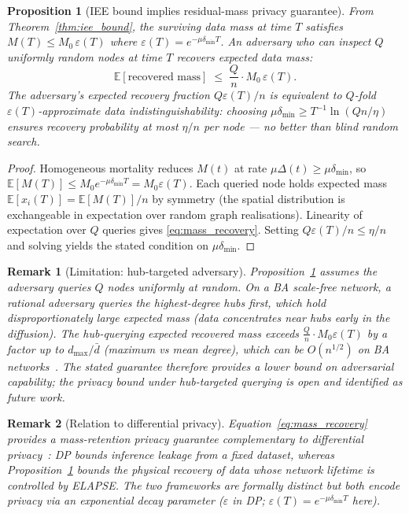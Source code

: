 \documentclass[review,12pt]{elsarticle}
\newtheorem{proposition}{Proposition}
\newtheorem{remark}{Remark}
\begin{document}
\begin{proposition}[IEE bound implies residual-mass privacy guarantee]
\label{prop:privacy}
From Theorem~\ref{thm:iee_bound}, the surviving data mass at time $T$
satisfies $M(T) \leq M_0\,\varepsilon(T)$ where
$\varepsilon(T) = e^{-\mu\delta_{\min}T}$.
An adversary who can inspect $Q$ uniformly random nodes at time $T$
recovers expected data mass:
\begin{equation}
  \mathbb{E}[\text{recovered mass}] \;\leq\;
    \frac{Q}{n}\cdot M_0\,\varepsilon(T).
  \label{eq:mass_recovery}
\end{equation}
The adversary's expected \emph{recovery fraction} $Q\varepsilon(T)/n$
is equivalent to $Q$-fold $\varepsilon(T)$-approximate data indistinguishability:
choosing $\mu\delta_{\min} \geq T^{-1}\ln(Qn/\eta)$ ensures recovery
probability at most $\eta/n$ per node --- no better than blind random search.
\end{proposition}

\begin{proof}
Homogeneous mortality reduces $M(t)$ at rate $\mu\Delta(t) \geq \mu\delta_{\min}$,
so $\mathbb{E}[M(T)] \leq M_0 e^{-\mu\delta_{\min}T} = M_0\varepsilon(T)$.
Each queried node holds expected mass $\mathbb{E}[x_i(T)] = \mathbb{E}[M(T)]/n$
by symmetry (the spatial distribution is exchangeable in expectation over
random graph realisations).  Linearity of expectation over $Q$ queries
gives \eqref{eq:mass_recovery}.  Setting $Q\varepsilon(T)/n \leq \eta/n$
and solving yields the stated condition on $\mu\delta_{\min}$.
\end{proof}

\begin{remark}[Limitation: hub-targeted adversary]
\label{rem:privacy_hub}
Proposition~\ref{prop:privacy} assumes the adversary queries $Q$ nodes
\emph{uniformly at random}.  On a BA scale-free network, a rational adversary
queries the highest-degree hubs first, which hold disproportionately large
expected mass (data concentrates near hubs early in the diffusion).  The
hub-querying expected recovered mass exceeds $\frac{Q}{n}\cdot M_0\varepsilon(T)$
by a factor up to $d_{\max}/\bar{d}$ (maximum vs mean degree), which can be
$O(n^{1/2})$ on BA networks~\cite{barabasi1999emergence}.  The stated guarantee
therefore provides a lower bound on adversarial capability; the privacy bound
under hub-targeted querying is open and identified as future work.
\end{remark}

\begin{remark}[Relation to differential privacy]
\label{rem:dp}
Equation~\eqref{eq:mass_recovery} provides a \emph{mass-retention} privacy
guarantee complementary to differential privacy~\cite{dwork2014algorithmic}:
DP bounds inference leakage from a fixed dataset, whereas
Proposition~\ref{prop:privacy} bounds the \emph{physical recovery} of data
whose network lifetime is controlled by ELAPSE.  The two frameworks are
formally distinct but both encode privacy via an exponential decay parameter
($\varepsilon$ in DP; $\varepsilon(T)=e^{-\mu\delta_{\min}T}$ here).
\end{remark}
\end{document}
